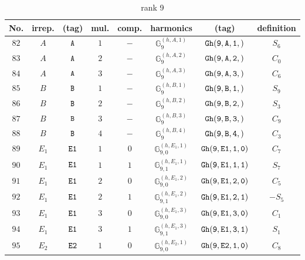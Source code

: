 \documentclass[fleqn,8pt]{jsarticle}
\begin{document}
\begin{table}[ht!]
\begin{center}
\caption{rank 9}
\renewcommand{\arraystretch}{1.3}
\begin{tabular}{cccccccc} \hline \hline
No. & irrep. & (tag) & mul. & comp. & harmonics & (tag) & definition \\ \hline
$ 82 $ & $ A $ & $ {\tt A} $ & $ 1 $ & $ - $ & $ \mathbb{G}_{9}^{(h,A,1)} $ & $ {\tt Gh(9,A,1,)} $ & $ S_{6} $ \\
$ 83 $ & $ A $ & $ {\tt A} $ & $ 2 $ & $ - $ & $ \mathbb{G}_{9}^{(h,A,2)} $ & $ {\tt Gh(9,A,2,)} $ & $ C_{0} $ \\
$ 84 $ & $ A $ & $ {\tt A} $ & $ 3 $ & $ - $ & $ \mathbb{G}_{9}^{(h,A,3)} $ & $ {\tt Gh(9,A,3,)} $ & $ C_{6} $ \\
$ 85 $ & $ B $ & $ {\tt B} $ & $ 1 $ & $ - $ & $ \mathbb{G}_{9}^{(h,B,1)} $ & $ {\tt Gh(9,B,1,)} $ & $ S_{9} $ \\
$ 86 $ & $ B $ & $ {\tt B} $ & $ 2 $ & $ - $ & $ \mathbb{G}_{9}^{(h,B,2)} $ & $ {\tt Gh(9,B,2,)} $ & $ S_{3} $ \\
$ 87 $ & $ B $ & $ {\tt B} $ & $ 3 $ & $ - $ & $ \mathbb{G}_{9}^{(h,B,3)} $ & $ {\tt Gh(9,B,3,)} $ & $ C_{9} $ \\
$ 88 $ & $ B $ & $ {\tt B} $ & $ 4 $ & $ - $ & $ \mathbb{G}_{9}^{(h,B,4)} $ & $ {\tt Gh(9,B,4,)} $ & $ C_{3} $ \\
$ 89 $ & $ E_{1} $ & $ {\tt E1} $ & $ 1 $ & $ 0 $ & $ \mathbb{G}_{9,0}^{(h,E_{1},1)} $ & $ {\tt Gh(9,E1,1,0)} $ & $ C_{7} $ \\
$ 90 $ & $ E_{1} $ & $ {\tt E1} $ & $ 1 $ & $ 1 $ & $ \mathbb{G}_{9,1}^{(h,E_{1},1)} $ & $ {\tt Gh(9,E1,1,1)} $ & $ S_{7} $ \\
$ 91 $ & $ E_{1} $ & $ {\tt E1} $ & $ 2 $ & $ 0 $ & $ \mathbb{G}_{9,0}^{(h,E_{1},2)} $ & $ {\tt Gh(9,E1,2,0)} $ & $ C_{5} $ \\
$ 92 $ & $ E_{1} $ & $ {\tt E1} $ & $ 2 $ & $ 1 $ & $ \mathbb{G}_{9,1}^{(h,E_{1},2)} $ & $ {\tt Gh(9,E1,2,1)} $ & $ - S_{5} $ \\
$ 93 $ & $ E_{1} $ & $ {\tt E1} $ & $ 3 $ & $ 0 $ & $ \mathbb{G}_{9,0}^{(h,E_{1},3)} $ & $ {\tt Gh(9,E1,3,0)} $ & $ C_{1} $ \\
$ 94 $ & $ E_{1} $ & $ {\tt E1} $ & $ 3 $ & $ 1 $ & $ \mathbb{G}_{9,1}^{(h,E_{1},3)} $ & $ {\tt Gh(9,E1,3,1)} $ & $ S_{1} $ \\
$ 95 $ & $ E_{2} $ & $ {\tt E2} $ & $ 1 $ & $ 0 $ & $ \mathbb{G}_{9,0}^{(h,E_{2},1)} $ & $ {\tt Gh(9,E2,1,0)} $ & $ C_{8} $ \\

\end{tabular}
\end{center}
\end{table}
\end{document}
